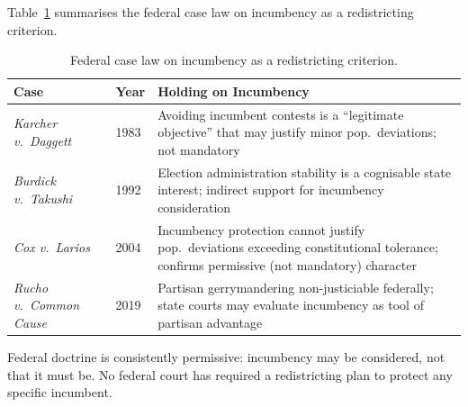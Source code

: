 Table~\ref{tab:federal-cases} summarises the federal case law on incumbency as a
redistricting criterion.

\begin{table}[ht]
\centering
\begin{threeparttable}
\caption{Federal case law on incumbency as a redistricting criterion.}
\label{tab:federal-cases}
\begin{tabular}{p{4.5cm} l p{6cm}}
\toprule
Case & Year & Holding on Incumbency \\
\midrule
\textit{Karcher v.\ Daggett} & 1983 & Avoiding incumbent contests is a ``legitimate
  objective'' that may justify minor pop.\ deviations; not mandatory \\
\addlinespace
\textit{Burdick v.\ Takushi} & 1992 & Election administration stability is a cognisable
  state interest; indirect support for incumbency consideration \\
\addlinespace
\textit{Cox v.\ Larios} & 2004 & Incumbency protection cannot justify pop.\ deviations
  exceeding constitutional tolerance; confirms permissive (not mandatory) character \\
\addlinespace
\textit{Rucho v.\ Common Cause} & 2019 & Partisan gerrymandering non-justiciable
  federally; state courts may evaluate incumbency as tool of partisan advantage \\
\bottomrule
\end{tabular}
\begin{tablenotes}
\small
\item Federal doctrine is consistently permissive: incumbency may be considered, not
  that it must be. No federal court has required a redistricting plan to protect
  any specific incumbent.
\end{tablenotes}
\end{threeparttable}
\end{table}
